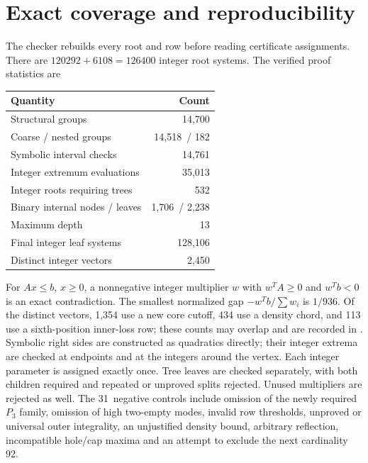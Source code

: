 \documentclass[11pt,a4paper]{article}
\newcommand{\RootGroups}{14,700}
\newcommand{\CoarseGroups}{14,518}
\newcommand{\NestedGroups}{182}
\newcommand{\IntervalChecks}{14,761}
\newcommand{\ExtremumPoints}{35,013}
\newcommand{\TreeRoots}{532}
\newcommand{\BinaryNodes}{1,706}
\newcommand{\TreeLeaves}{2,238}
\newcommand{\MaxDepth}{13}
\newcommand{\FinalSystems}{128,106}
\newcommand{\Vectors}{2,450}
\newcommand{\MinGap}{1/936}
\newcommand{\NegativeControls}{31}
\begin{document}
\section{Exact coverage and reproducibility}
The checker rebuilds every root and row before reading certificate
assignments. There are $120292+6108=126400$ integer root systems.
The verified proof statistics are
\begin{center}\small
\begin{tabular}{lr}\toprule
Quantity&Count\\\midrule
Structural groups&\RootGroups\\
Coarse / nested groups&\CoarseGroups\ / \NestedGroups\\
Symbolic interval checks&\IntervalChecks\\
Integer extremum evaluations&\ExtremumPoints\\
Integer roots requiring trees&\TreeRoots\\
Binary internal nodes / leaves&\BinaryNodes\ / \TreeLeaves\\
Maximum depth&\MaxDepth\\
Final integer leaf systems&\FinalSystems\\
Distinct integer vectors&\Vectors\\\bottomrule
\end{tabular}
\end{center}
For $Ax\le b$, $x\ge0$, a nonnegative integer multiplier $w$ with
$w^TA\ge0$ and $w^Tb<0$ is an exact contradiction. The smallest
normalized gap $-w^Tb/\sum w_i$ is $\MinGap$.
Of the distinct vectors, 1,354 use a new core cutoff, 434 use a density
chord, and 113 use a sixth-position inner-loss row; these counts may
overlap and are recorded in .
Symbolic right sides are constructed as quadratics directly; their
integer extrema are checked at endpoints and at the integers around
the vertex. Each integer parameter is assigned exactly once. Tree leaves
are checked separately, with both children required and repeated or
unproved splits rejected. Unused multipliers are rejected as well.
The \NegativeControls\ negative controls include omission of the newly
required $P_3$ family, omission of high two-empty modes, invalid row
thresholds, unproved or universal outer integrality, an unjustified density bound, arbitrary reflection, incompatible hole/cap maxima and an
attempt to exclude the next cardinality 92.
\end{document}
